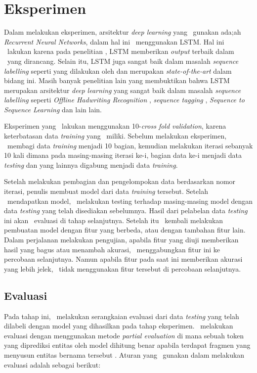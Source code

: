 \section{Eksperimen}
Dalam melakukan eksperimen, arsitektur \textit{deep learning} yang \saya~gunakan ada;ah \textit{Recurrent Neural Networks}, dalam hal ini \saya~menggunakan LSTM. Hal ini \saya~lakukan karena pada penelitian \cite{mujiono2016new}, LSTM memberikan \textit{output} terbaik dalam \mer~yang dirancang. Selain itu, LSTM juga sangat baik dalam masalah \textit{sequence labelling} seperti yang dilakukan oleh \cite{graves2013speech} dan merupakan \textit{state-of-the-art} dalam bidang ini. Masih banyak penelitian lain yang membuktikan bahwa LSTM merupakan arsitektur \textit{deep learning} yang sangat baik dalam masalah \textit{sequence labelling} seperti \textit{Offline Hadwriting Recognition} \citep{graves2009offline}, \textit{sequence tagging} \citep{huang2015bidirectional}, \textit{Sequence to Sequence Learning} \citep{NIPS2014_5346} dan lain lain.

Eksperimen yang \saya~lakukan menggunakan 10-\textit{cross fold validation}, karena keterbatasan data \textit{training} yang \saya~miliki. Sebelum melakukan eksperimen, \saya~membagi data \textit{training} menjadi 10 bagian, kemudian melakukan iterasi sebanyak 10 kali dimana pada masing-masing iterasi ke-i, bagian data ke-i menjadi data \textit{testing} dan yang lainnya digabung menjadi data \textit{training}. 

Setelah melakukan pembagian dan pengelompokan data berdasarkan nomor iterasi, penulis membuat model dari data \textit{training} tersebut. Setelah \saya~mendapatkan model, \saya~melakukan testing terhadap masing-masing model dengan data \textit{testing} yang telah disediakan sebelumnya. Hasil dari pelabelan data \textit{testing} ini akan \saya~evaluasi di tahap selanjutnya. Setelah itu \saya~kembali melakukan pembuatan model dengan fitur yang berbeda, atau dengan tambahan fitur lain. Dalam perjalanan melakukan pengujian, apabila fitur yang diuji memberikan hasil yang bagus atau menambah akurasi, \saya~menggabungkan fitur ini ke percobaan selanjutnya. Namun apabila fitur pada saat ini memberikan akurasi yang lebih jelek, \saya~tidak menggunakan fitur tersebut di percobaan selanjutnya.

\subsection{Evaluasi}
Pada tahap ini, \saya~melakukan serangkaian evaluasi dari data \textit{testing} yang telah dilabeli dengan model yang dihasilkan pada tahap eksperimen. \Saya~melakukan evaluasi dengan menggunakan metode \textit{partial evaluation} di mana sebuah token yang diprediksi entitas oleh model dihitung benar apabila terdapat fragmen yang menyusun entitas bernama tersebut \citep{seki2003probabilistic}. Aturan yang \saya~gunakan dalam melakukan evaluasi adalah sebagai berikut: 

